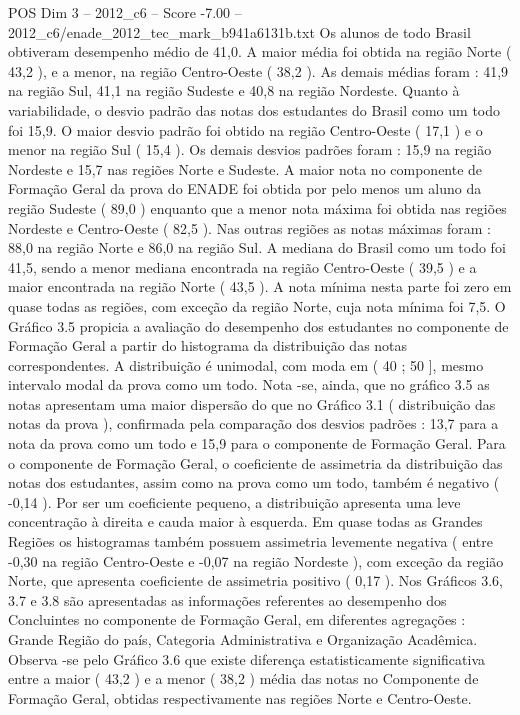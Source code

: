 \begin{textsample}{POS Dim 3 – 2012\_c6 – Score -7.00 – 2012\_c6/enade\_2012\_tec\_mark\_b941a6131b.txt}
Os alunos de todo Brasil obtiveram desempenho médio de 41,0.
A maior média foi obtida na região Norte ( 43,2 ), e a menor, na região Centro-Oeste ( 38,2 ).
As demais médias foram : 41,9 na região Sul, 41,1 na região Sudeste e 40,8 na região Nordeste.
Quanto à variabilidade, o desvio padrão das notas dos estudantes do Brasil como um todo foi 15,9.
O maior desvio padrão foi obtido na região Centro-Oeste ( 17,1 ) e o menor na região Sul ( 15,4 ).
Os demais desvios padrões foram : 15,9 na região Nordeste e 15,7 nas regiões Norte e Sudeste.
A maior nota no componente de Formação Geral da prova do ENADE foi obtida por pelo menos um aluno da região Sudeste ( 89,0 ) enquanto que a menor nota máxima foi obtida nas regiões Nordeste e Centro-Oeste ( 82,5 ).
Nas outras regiões as notas máximas foram : 88,0 na região Norte e 86,0 na região Sul.
A mediana do Brasil como um todo foi 41,5, sendo a menor mediana encontrada na região Centro-Oeste ( 39,5 ) e a maior encontrada na região Norte ( 43,5 ).
A nota mínima nesta parte foi zero em quase todas as regiões, com exceção da região Norte, cuja nota mínima foi 7,5.
O Gráfico 3.5 propicia a avaliação do desempenho dos estudantes no componente de Formação Geral a partir do histograma da distribuição das notas correspondentes.
A distribuição é unimodal, com moda em ( 40 ; 50 ], mesmo intervalo modal da prova como um todo.
Nota -se, ainda, que no gráfico 3.5 as notas apresentam uma maior dispersão do que no Gráfico 3.1 ( distribuição das notas da prova ), confirmada pela comparação dos desvios padrões : 13,7 para a nota da prova como um todo e 15,9 para o componente de Formação Geral.
Para o componente de Formação Geral, o coeficiente de assimetria da distribuição das notas dos estudantes, assim como na prova como um todo, também é negativo ( -0,14 ).
Por ser um coeficiente pequeno, a distribuição apresenta uma leve concentração à direita e cauda maior à esquerda.
Em quase todas as Grandes Regiões os histogramas também possuem assimetria levemente negativa ( entre -0,30 na região Centro-Oeste e -0,07 na região Nordeste ), com exceção da região Norte, que apresenta coeficiente de assimetria positivo ( 0,17 ).
Nos Gráficos 3.6, 3.7 e 3.8 são apresentadas as informações referentes ao desempenho dos Concluintes no componente de Formação Geral, em diferentes agregações : Grande Região do país, Categoria Administrativa e Organização Acadêmica.
Observa -se pelo Gráfico 3.6 que existe diferença estatisticamente significativa entre a maior ( 43,2 ) e a menor ( 38,2 ) média das notas no Componente de Formação Geral, obtidas respectivamente nas regiões Norte e Centro-Oeste.

\end{textsample}
